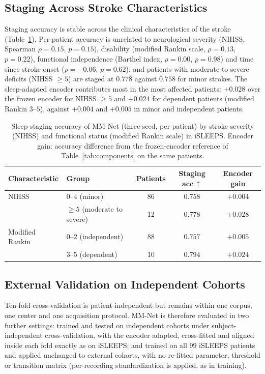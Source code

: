 \documentclass[a4paper,fleqn]{cas-sc}
\begin{document}
\subsection{Staging Across Stroke Characteristics}
\label{sec:stroke}
Staging accuracy is stable across the clinical characteristics of the stroke
(Table~\ref{tab:stroke}). Per-patient accuracy is unrelated to neurological severity (NIHSS,
Spearman $\rho=0.15$, $p=0.15$), disability (modified Rankin scale, $\rho=0.13$, $p=0.22$),
functional independence (Barthel index, $\rho=0.00$, $p=0.98$) and time since stroke onset
($\rho=-0.06$, $p=0.62$), and patients with moderate-to-severe deficits (NIHSS $\geq5$) are
staged at $0.778$ against $0.758$ for minor strokes. The sleep-adapted encoder contributes most in
the most affected patients: $+0.028$ over the frozen encoder for NIHSS $\geq5$ and $+0.024$ for
dependent patients (modified Rankin $3$--$5$), against $+0.004$ and $+0.005$ in minor and
independent patients.

\begin{table}[H]
\caption{Sleep-staging accuracy of MM-Net (three-seed, per patient) by stroke severity (NIHSS) and
functional status (modified Rankin scale) in iSLEEPS. Encoder gain: accuracy difference from the
frozen-encoder reference of Table~\ref{tab:components} on the same patients.}
\label{tab:stroke}
\centering
\small
\begin{tabular}{llccc}
\toprule
Characteristic & Group & Patients & Staging acc\,$\uparrow$ & Encoder gain \\
\midrule
NIHSS          & $0$--$4$ (minor)              & 86 & $0.758$ & $+0.004$ \\
               & $\geq5$ (moderate to severe)  & 12 & $0.778$ & $+0.028$ \\
Modified Rankin & $0$--$2$ (independent)       & 88 & $0.757$ & $+0.005$ \\
               & $3$--$5$ (dependent)          & 10 & $0.794$ & $+0.024$ \\
\bottomrule
\end{tabular}
\end{table}

\subsection{External Validation on Independent Cohorts}
\label{sec:external}
Ten-fold cross-validation is patient-independent but remains within one corpus, one center
and one acquisition protocol. MM-Net is therefore evaluated in two further settings: trained
and tested on independent cohorts under subject-independent cross-validation, with the encoder
adapted, cross-fitted and aligned inside each fold exactly as on iSLEEPS; and trained on all
$99$ iSLEEPS patients and applied unchanged to external cohorts, with no re-fitted parameter,
threshold or transition matrix (per-recording standardization is applied, as in training).
\end{document}
